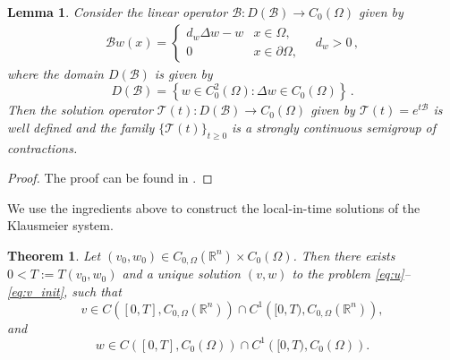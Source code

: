 \documentclass[11pt, a4paper]{article}
\theoremstyle{break}
\newtheorem{thm}{Theorem}[section]
\theoremstyle{break}
\theoremstyle{break}
\theoremstyle{break}
\theoremstyle{break}
\newtheorem{lem}{Lemma}[section]
\theoremstyle{break}
\theoremstyle{break}
\theoremstyle{break}
\theoremstyle{break}
\theoremstyle{break}
\begin{document}
\begin{lem}
    \label{lem:B_SEMIGROUP_GENERATOR}
    Consider the linear operator $\mathcal{B}: D(\mathcal{B}) \to C_0(\Omega)$ given by 
    \begin{align}
        \label{EQ:B_OPERATOR_DEFINITION}
        \mathcal{B} w (x) = 
        \begin{cases}
            d_w \Delta w - w &x \in \Omega, \\
            0 &x \in \partial \Omega, 
        \end{cases} \quad d_w > 0 \,, 
    \end{align}
    where the domain $D(\mathcal{B})$ is given by
    \begin{equation}
        \label{EQ:B_DOMAIN_DEFINITION}
        D(\mathcal{B}) = \left\{ w \in C^2_0(\Omega): \Delta w \in C_0(\Omega) \right\}\,.
    \end{equation}
    Then the solution operator $\mathcal{T}(t): D(\mathcal{B}) \to C_0(\Omega)$ given by $\mathcal{T}(t) = e^{t\mathcal{B}}$ is well defined and the family $\{\mathcal{T}(t)\}_{t \geq 0}$ is a strongly continuous semigroup of contractions.
\end{lem}
\begin{proof}
    The proof can be found in  \cite[Theorem 6.1.8]{Arendt2001}.
\end{proof}
We use the ingredients above to construct the local-in-time solutions of the Klausmeier system.
\begin{thm}
    \label{thm:Well-Posedness}
    Let $(v_0, w_0) \in C_{0, \Omega}(\mathbb{R}^n) \times C_0(\Omega)$. Then there exists $0 < T := T(v_0, w_0)$ and a unique solution $(v, w)$ to the problem \eqref{eq:u}--\eqref{eq:v_init}, such that
    \begin{equation}
        v \in C\left([0, T], C_{0, \Omega}(\mathbb{R}^n)\right) \cap C^1\left([0, T), C_{0, \Omega}(\mathbb{R}^n)\right),
    \end{equation}
    and
    \begin{equation}
        w \in C\left([0, T], C_0(\Omega)\right) \cap C^1\left([0, T), C_0(\Omega)\right).
    \end{equation}
\end{thm}
\end{document}
